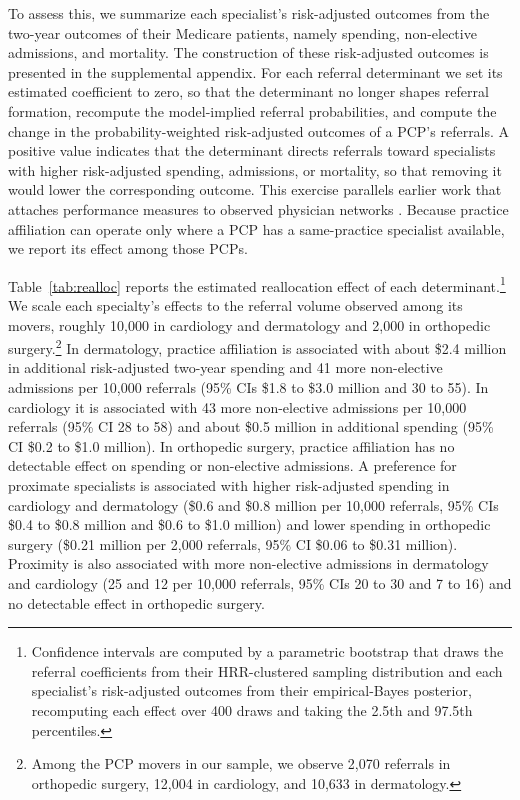 \documentclass[12pt]{article}
\begin{document}
To assess this, we summarize each specialist's risk-adjusted outcomes from the two-year outcomes of their Medicare patients, namely spending, non-elective admissions, and mortality. The construction of these risk-adjusted outcomes is presented in the supplemental appendix. For each referral determinant we set its estimated coefficient to zero, so that the determinant no longer shapes referral formation, recompute the model-implied referral probabilities, and compute the change in the probability-weighted risk-adjusted outcomes of a PCP's referrals. A positive value indicates that the determinant directs referrals toward specialists with higher risk-adjusted spending, admissions, or mortality, so that removing it would lower the corresponding outcome. This exercise parallels earlier work that attaches performance measures to observed physician networks \citep{barnett2012mc, landon_using_2013, zeltzer2020}. Because practice affiliation can operate only where a PCP has a same-practice specialist available, we report its effect among those PCPs.

Table~\ref{tab:realloc} reports the estimated reallocation effect of each determinant.\footnote{Confidence intervals are computed by a parametric bootstrap that draws the referral coefficients from their HRR-clustered sampling distribution and each specialist's risk-adjusted outcomes from their empirical-Bayes posterior, recomputing each effect over 400 draws and taking the 2.5th and 97.5th percentiles.} We scale each specialty's effects to the referral volume observed among its movers, roughly 10,000 in cardiology and dermatology and 2,000 in orthopedic surgery.\footnote{Among the PCP movers in our sample, we observe 2,070 referrals in orthopedic surgery, 12,004 in cardiology, and 10,633 in dermatology.} In dermatology, practice affiliation is associated with about \$2.4 million in additional risk-adjusted two-year spending and 41 more non-elective admissions per 10,000 referrals (95\% CIs \$1.8 to \$3.0 million and 30 to 55). In cardiology it is associated with 43 more non-elective admissions per 10,000 referrals (95\% CI 28 to 58) and about \$0.5 million in additional spending (95\% CI \$0.2 to \$1.0 million). In orthopedic surgery, practice affiliation has no detectable effect on spending or non-elective admissions. A preference for proximate specialists is associated with higher risk-adjusted spending in cardiology and dermatology (\$0.6 and \$0.8 million per 10,000 referrals, 95\% CIs \$0.4 to \$0.8 million and \$0.6 to \$1.0 million) and lower spending in orthopedic surgery (\$0.21 million per 2,000 referrals, 95\% CI \$0.06 to \$0.31 million). Proximity is also associated with more non-elective admissions in dermatology and cardiology (25 and 12 per 10,000 referrals, 95\% CIs 20 to 30 and 7 to 16) and no detectable effect in orthopedic surgery.
\end{document}
